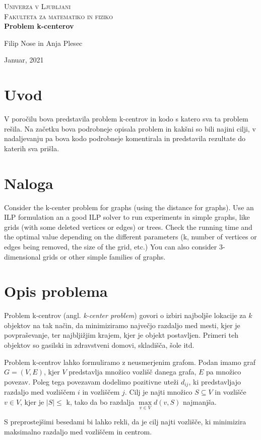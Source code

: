 \documentclass[a4paper]{article}
\begin{document}
\begin{titlepage}
\center
\textsc{\LARGE Univerza v Ljubljani}\\[0.5cm]
\textsc{\Large Fakulteta za matematiko in fiziko}\\[0.5cm]

{\huge\bfseries Problem k-centerov}\\[0.4cm]


\vfill\vfill\vfill

{ Filip Nose in Anja Plesec}

{ Januar, 2021}

\vfill

\end{titlepage}

\tableofcontents

\newpage

\section{Uvod}
V poročilu bova predstavila problem k-centrov in kodo s katero sva ta problem rešila. Na začetku bova podrobneje opisala problem in kakšni so bili najini cilji, v nadaljevanju pa bova kodo podrobneje komentirala in predstavila rezultate do katerih sva prišla.

\section{Naloga}
Consider the k-center problem for graphs (using the distance for graphs). Use an ILP formulation an a good ILP solver to run experiments in simple graphs, like grids (with some deleted vertices or edges) or trees. Check the running time and the optimal value depending on the different parameters (k, number of vertices or edges being removed, the size of the grid, etc.) You can also consider 3-dimensional grids or other simple families of graphs.

\section{Opis problema}

Problem k-centrov (angl. \textit{k-center problem}) govori o izbiri najboljše lokacije za $k$ objektov na tak način, da minimiziramo največjo razdaljo med mesti, kjer je povpraševanje, ter najbljižjim krajem, kjer je objekt postavljen. Primeri teh objektov so gasilski in zdravstveni domovi, skladišča, šole itd.
\par
Problem k-centrov lahko formuliramo z neusmerjenim grafom. Podan imamo graf $G = (V, E)$, kjer $V$ predstavlja množico vozlišč danega grafa, $E$ pa množico povezav. Poleg tega povezavam dodelimo pozitivne uteži $d_{ij}$, ki predstavljajo razdaljo med vozliščem $i$ in vozliščem $j$. Cilj je najti množico $S \subseteq V$  in vozlišče $v \in V$, kjer je $|S|\leq$ k, tako da bo razdalja $\max\limits_{v \in V} d(v, S)$ najmanjša.
\par
 S preprostejšimi besedami bi lahko rekli, da je cilj najti vozlišče, ki minimizira maksimalno razdaljo med vozliščem in centrom.
\end{document}
